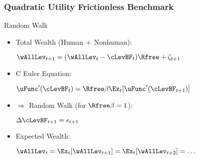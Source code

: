 \documentclass{beamer}\usepackage{dcolumn}
\newcommand{\jemph}[1]{{\color{StataDarkBlue}#1}}
\providecommand{\jemph}[1]{{\color{jirkasblue}#1}}
\begin{document}
\begin{frame}
\frametitle{Quadratic Utility Frictionless Benchmark}

\begin{block}{\cite{hallRandomWalk} Random Walk}
\phantom{.}
\begin{itemize}
\item \jemph{Total Wealth} (Human$\,+\,$Nonhuman):\\
\begin{center}
{$\wAllLev_{t+1} = (\wAllLev_{t}-\cLevBF_{t})\Rfree+\zeta_{t+1}$}
\end{center}
\item \jemph{C Euler Equation}: \\
\begin{center}
{$\uFunc^{\prime}(\cLevBF_{t}) = \Rfree\beta \Ex_{t}[\uFunc^{\prime}(\cLevBF_{t+1})]$}
\end{center}
\item $\Rightarrow$ \jemph{Random Walk} (for $\Rfree\beta=1$): \\
\begin{center}
{$\Delta \cLevBF_{t+1} = \epsilon_{t+1}$}
\end{center}
\item \jemph{Expected Wealth}: \\
\begin{center}
{$\wAllLev_{t} = \Ex_{t}[\wAllLev_{t+1}] = \Ex_{t}[\wAllLev_{t+2}] = \dots$}
\end{center}
\end{itemize}
\end{block}

\end{frame}
\end{document}
